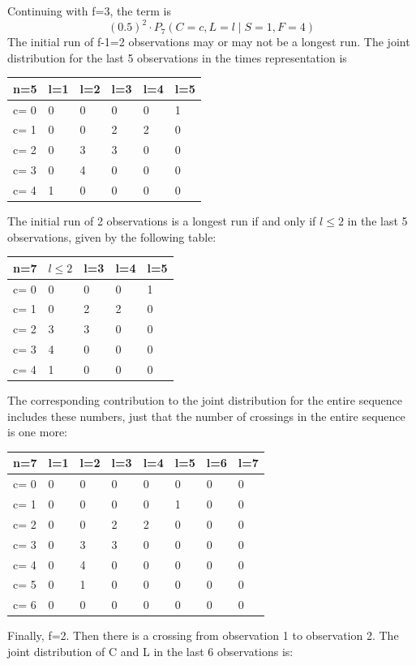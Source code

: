 Continuing with f=3, the term is $$(0.5)^2 \cdot   P_7 (C=c, L=l \mid S=1,F=4)$$
The initial run of f-1=2 observations may or may not be a longest run. The joint distribution for the last 5 observations in the times representation is 

\begin{tabular}{l | l l l l l}
\hline
n=5&l=1&l=2&l=3&l=4&l=5\\
\hline
c= 0& 0& 0& 0& 0& 1\\
c= 1& 0& 0& 2& 2& 0\\
c= 2& 0& 3& 3& 0& 0\\
c= 3& 0& 4& 0& 0& 0\\
c= 4& 1& 0& 0& 0& 0\\
\hline
\end{tabular}

The initial run of 2 observations is a longest run if and only if $l \leq 2$ in the last 5 observations, given by the following table:

\begin{tabular}{l | l l l l}
\hline
n=7&$l \leq 2$&l=3&l=4&l=5\\
\hline
c= 0& 0& 0& 0& 1\\
c= 1& 0& 2& 2& 0\\
c= 2& 3& 3& 0& 0\\
c= 3& 4& 0& 0& 0\\
c= 4& 1& 0& 0& 0\\
\hline
\end{tabular}

The corresponding contribution to the joint distribution for the entire sequence includes these numbers, just that the number of crossings in the entire sequence is one more:

\begin{tabular}{l | l l l l l l l}
\hline
n=7&l=1&l=2&l=3&l=4&l=5&l=6&l=7\\
\hline
c= 0& 0& 0& 0& 0& 0& 0& 0\\
c= 1& 0& 0& 0& 0& 1& 0& 0\\
c= 2& 0& 0& 2& 2& 0& 0& 0\\
c= 3& 0& 3& 3& 0& 0& 0& 0\\
c= 4& 0& 4& 0& 0& 0& 0& 0\\
c= 5& 0& 1& 0& 0& 0& 0& 0\\
c= 6& 0& 0& 0& 0& 0& 0& 0\\
\hline
\end{tabular}

Finally, f=2. Then there is a crossing from observation 1 to observation 2. The joint distribution of C and L in the last 6 observations is:

